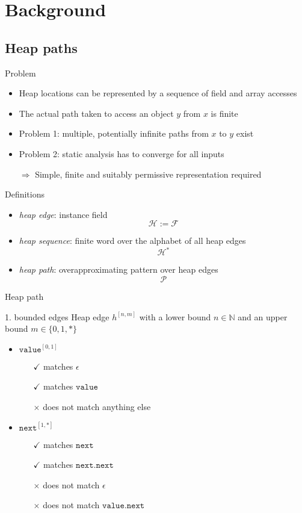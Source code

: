 \documentclass{beamer}
\begin{document}
\section{Background}
\subsection{Heap paths}
\begin{frame}{Problem}
\begin{itemize}
    \item Heap locations can be represented by a sequence of field and array accesses
    \item The actual path taken to access an object $y$ from $x$ is finite
    \item Problem 1: multiple, potentially infinite paths from $x$ to $y$ exist
    \item Problem 2: static analysis has to converge for all inputs
    \item[$\Rightarrow$] Simple, finite and suitably permissive representation required
\end{itemize}
\end{frame}
\begin{frame}{Definitions}
\begin{itemize}
    \item \emph{heap edge}: instance field \[ \mathcal{H} := \mathcal{F} \]
    \item \emph{heap sequence}: finite word over the alphabet of all heap edges \[ \mathcal{H}^* \]
    \item \emph{heap path}: overapproximating pattern over heap edges \[ \mathcal{P} \]
\end{itemize}
\end{frame}
\begin{frame}{Heap path}
\begin{block}{1. bounded edges}
Heap edge $h^{[n,m]}$ with a lower bound $n \in \mathbb{N}$ and an upper bound $m \in \{ 0,1,* \}$
\begin{itemize}
    \item<1-> $\mathtt{value}^{[0,1]}$
        \begin{itemize}
            \item[$\checkmark$] matches $\epsilon$
            \item[$\checkmark$] matches $\mathtt{value}$
            \item[$\times$] does not match anything else
        \end{itemize}
    \item<2-> $\mathtt{next}^{[1,*]}$
        \begin{itemize}
            \item[$\checkmark$] matches $\mathtt{next}$
            \item[$\checkmark$] matches $\mathtt{next.next}$
            \item[$\times$] does not match $\epsilon$
            \item[$\times$] does not match $\mathtt{value.next}$
        \end{itemize}
\end{itemize}
\end{block}
\end{frame}
\end{document}
